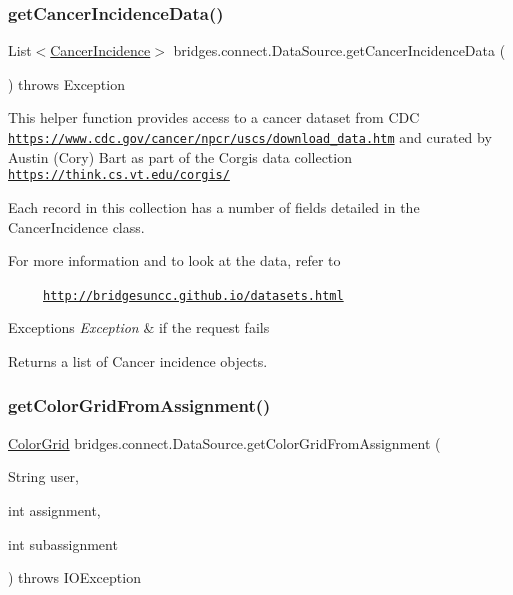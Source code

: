 \subsubsection{\texorpdfstring{get\+Cancer\+Incidence\+Data()}{getCancerIncidenceData()}}
{\footnotesize\ttfamily List$<$\hyperlink{classbridges_1_1data__src__dependent_1_1_cancer_incidence}{Cancer\+Incidence}$>$ bridges.\+connect.\+Data\+Source.\+get\+Cancer\+Incidence\+Data (\begin{DoxyParamCaption}{ }\end{DoxyParamCaption}) throws Exception}

This helper function provides access to a cancer dataset from C\+DC \href{https://www.cdc.gov/cancer/npcr/uscs/download_data.htm}{\tt https\+://www.\+cdc.\+gov/cancer/npcr/uscs/download\+\_\+data.\+htm} and curated by Austin (Cory) Bart as part of the Corgis data collection \href{https://think.cs.vt.edu/corgis/}{\tt https\+://think.\+cs.\+vt.\+edu/corgis/}

Each record in this collection has a number of fields detailed in the Cancer\+Incidence class.

For more information and to look at the data, refer to 

~~~~~\href{http://bridgesuncc.github.io/datasets.html}{\tt http\+://bridgesuncc.\+github.\+io/datasets.\+html} 


\begin{DoxyExceptions}{Exceptions}
{\em Exception} & if the request fails\\
\hline
\end{DoxyExceptions}
\begin{DoxyReturn}{Returns}
a list of Cancer incidence objects. 
\end{DoxyReturn}
\mbox{\label{classbridges_1_1connect_1_1_data_source_a7bddb93c9196a1109f2bf36054500ed8}} 
\subsubsection{\texorpdfstring{get\+Color\+Grid\+From\+Assignment()}{getColorGridFromAssignment()}\hspace{0.1cm}{\footnotesize\ttfamily [1/4]}}
{\footnotesize\ttfamily \hyperlink{classbridges_1_1base_1_1_color_grid}{Color\+Grid} bridges.\+connect.\+Data\+Source.\+get\+Color\+Grid\+From\+Assignment (\begin{DoxyParamCaption}\item[{String}]{user,  }\item[{int}]{assignment,  }\item[{int}]{subassignment }\end{DoxyParamCaption}) throws I\+O\+Exception}

